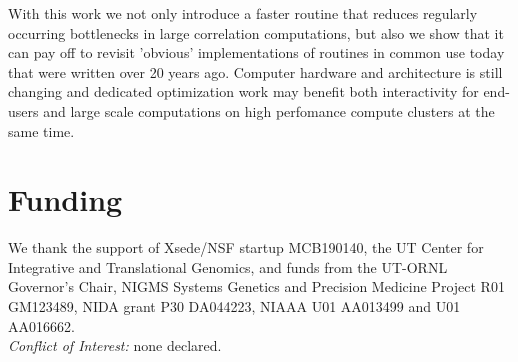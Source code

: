 \documentclass{bioinfo}
\begin{document}
With this work we not only introduce a faster routine that reduces
regularly occurring bottlenecks in large correlation computations, but
also we show that it can pay off to revisit 'obvious' implementations
of routines in common use today that were written over 20 years
ago. Computer hardware and architecture is still changing and
dedicated optimization work may benefit both interactivity for
end-users and large scale computations on high perfomance compute
clusters at the same time.


\section*{Funding}

We thank the support of Xsede/NSF startup MCB190140, the UT Center for
Integrative and Translational Genomics, and funds from the UT-ORNL
Governor's Chair, NIGMS Systems Genetics and Precision Medicine
Project R01 GM123489, NIDA grant P30 DA044223, NIAAA U01 AA013499 and
U01 AA016662.\\
\textit{Conflict of Interest:} none declared.

\vspace*{-5mm}


\end{document}
